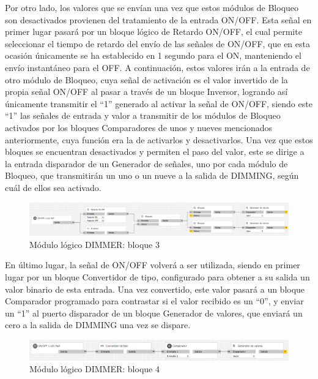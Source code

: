 \begin{itemize}
Por otro lado, los valores que se envían una vez que estos módulos de Bloqueo son desactivados provienen del tratamiento de la entrada ON/OFF. Esta señal en primer lugar pasará por un bloque lógico de Retardo ON/OFF, el cual permite seleccionar el tiempo de retardo del envío de las señales de ON/OFF, que en esta ocasión únicamente se ha establecido en 1 segundo para el ON, manteniendo el envío instantáneo para el OFF. A continuación, estos valores irán a la entrada de otro módulo de Bloqueo, cuya señal de activación es el valor invertido de la propia señal ON/OFF al pasar a través de un bloque Inversor, logrando así únicamente transmitir el “1” generado al activar la señal de ON/OFF, siendo este “1” las señales de entrada y valor a transmitir de los módulos de Bloqueo activados por los bloques Comparadores de unos y nueves mencionados anteriormente, cuya función era la de activarlos y desactivarlos. Una vez que estos bloques se encuentran desactivados y permiten el paso del valor, este se dirige a la entrada disparador de un Generador de señales, uno por cada módulo de Bloqueo, que transmitirán un uno o un nueve a la salida de DIMMING, según cuál de ellos sea activado.
 \begin{center}
\begin{figure}[H]
\includegraphics[width=1.15\textwidth]{figures/log_dimm_b3.png}   
\caption{Módulo lógico DIMMER: bloque 3}
\label{fig:log_dimm_b3}
\end{figure}
\end{center}
En último lugar, la señal de ON/OFF volverá a ser utilizada, siendo en primer lugar por un bloque Convertidor de tipo, configurado para obtener a su salida un valor binario de esta entrada. Una vez convertido, este valor pasará a un bloque Comparador programado para  contrastar si el valor recibido es un “0”, y enviar un “1” al puerto disparador de un bloque Generador de valores, que enviará un cero a la salida de DIMMING una vez se dispare. 
 \begin{center}
\begin{figure}[H]
\includegraphics[width=1.15\textwidth]{figures/log_dimm_b4.png}   
\caption{Módulo lógico DIMMER: bloque 4}

\end{figure}
\end{center}
\end{itemize}
